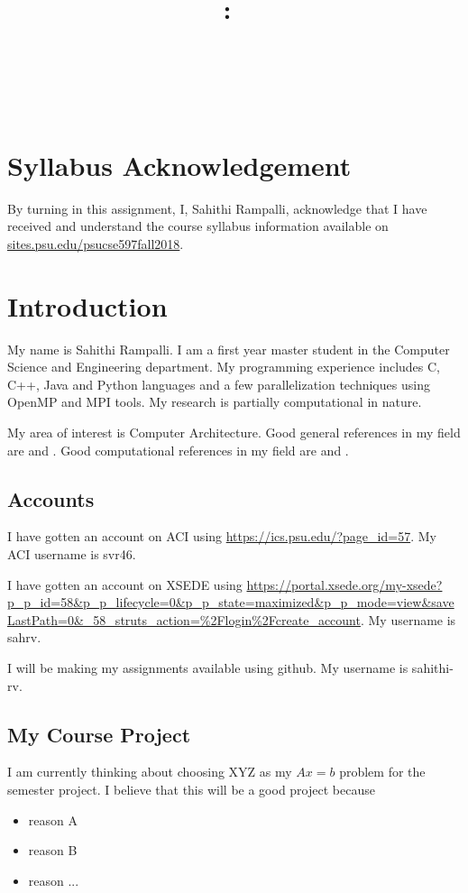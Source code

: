 \documentclass{article}
\title{\vspace{2in}\textmd{\textbf{\hmwkClass:\ \hmwkTitle}}\\\normalsize\vspace{0.1in}\small{\hmwkDueDate}\\\vspace{0.1in}\large{\textit{\hmwkClassInstructor\ \hmwkClassTime}}\vspace{3in}}
\date{}
\author{\textbf{\hmwkAuthorNameb} } %
\begin{document}
\begin{spacing}{1.1}
\maketitle

\newpage
\section{Syllabus Acknowledgement}

By turning in this assignment, I, Sahithi Rampalli, acknowledge that I have received and understand the course syllabus information available on \url{sites.psu.edu/psucse597fall2018}. 

\section{Introduction}

My name is Sahithi Rampalli.  I am a first year master student in the Computer Science and Engineering department. My programming experience includes C, C++, Java and Python languages and a few parallelization techniques using OpenMP and MPI tools. My research is partially computational in nature. 

My area of interest is Computer Architecture. Good general references in my field are \cite{Hennessy2017Computer} and \cite{david2015Computer}.  Good computational references in my field are \cite{Barnes1998Digital} and \cite{Flynn2000Comp}. 


\subsection{Accounts}

I have gotten an account on ACI using \url{https://ics.psu.edu/?page_id=57}.  My ACI username is svr46.

I have gotten an account on XSEDE using \url{https://portal.xsede.org/my-xsede?p_p_id=58&p_p_lifecycle=0&p_p_state=maximized&p_p_mode=view&saveLastPath=0&_58_struts_action=%2Flogin%2Fcreate_account}.  My username is sahrv.

I will be making my assignments available using github. My username is sahithi-rv. 

\subsection{My Course Project}

I am currently thinking about choosing XYZ as my $Ax=b$ problem for the semester project. I believe that this will be a good project because
\begin{itemize}
  \item reason A
  \item reason B
  \item reason ...
\end{itemize}



\end{spacing}
\end{document}
